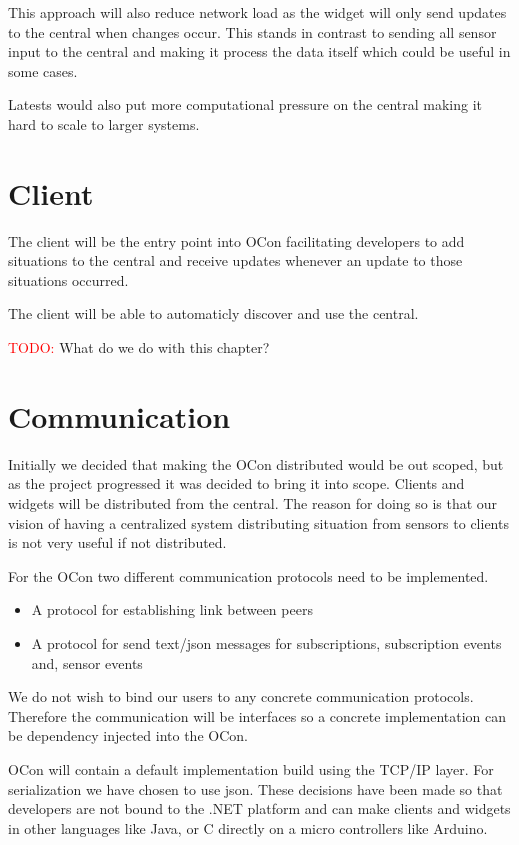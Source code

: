 \documentclass[]{report}
\newcommand\todo[1]{\textcolor{red}{TODO: }#1\PackageWarning{TODO:}{TODO tag!!}}
\begin{document}
This approach will also reduce network load as the widget will only send updates to the central when changes occur. This stands in contrast to sending all sensor input to the central and making it process the data itself which could be useful in some cases.

Latests would also put more computational pressure on the central making it hard to scale to larger systems.


\section{Client}

The client will be the entry point into OCon facilitating developers to add situations to the central and receive updates whenever an update to those situations occurred.

The client will be able to automaticly discover and use the central. 

\todo What do we do with this chapter?


\section{Communication}

Initially we decided that making the OCon distributed would be out scoped, but as the project progressed it was decided to bring it into scope. Clients and widgets will be distributed from the central. The reason for doing so is that our vision of having a centralized system distributing situation from sensors to clients is not very useful if not distributed.

For the OCon two different communication protocols need to be implemented.\\

\begin{itemize}
	\item A protocol for establishing link between peers
	\item A protocol for send text/json messages for subscriptions, subscription events and, sensor events \\
\end{itemize}

We do not wish to bind our users to any concrete communication protocols. Therefore the communication will be interfaces so a concrete implementation can be dependency injected into the OCon.

OCon will contain a default implementation build using the TCP/IP layer. For serialization we have chosen to use json. These decisions have been made so that developers are not bound to the .NET platform and can make clients and widgets in other languages like Java, or C directly on a micro controllers like Arduino.
\end{document}
